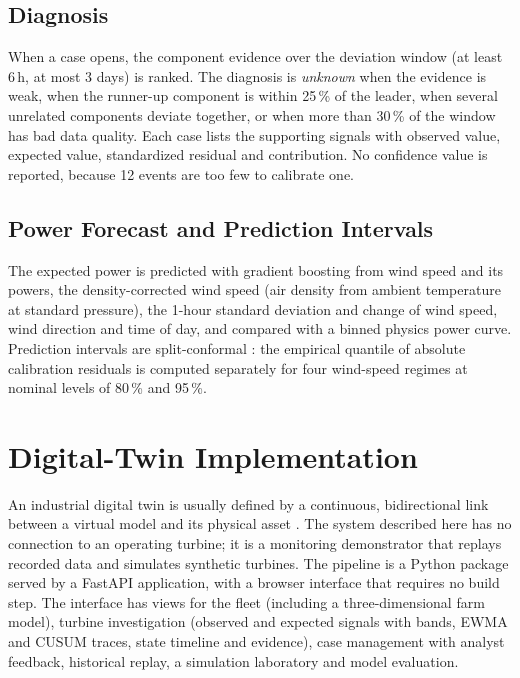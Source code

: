 \documentclass[conference]{IEEEtran}
\begin{document}
\subsection{Diagnosis}
When a case opens, the component evidence over the deviation window (at least 6\,h, at most 3 days) is ranked. The diagnosis is \emph{unknown} when the evidence is weak, when the runner-up component is within 25\,\% of the leader, when several unrelated components deviate together, or when more than 30\,\% of the window has bad data quality. Each case lists the supporting signals with observed value, expected value, standardized residual and contribution. No confidence value is reported, because 12 events are too few to calibrate one.

\subsection{Power Forecast and Prediction Intervals}
The expected power is predicted with gradient boosting from wind speed and its powers, the density-corrected wind speed (air density from ambient temperature at standard pressure), the 1-hour standard deviation and change of wind speed, wind direction and time of day, and compared with a binned physics power curve. Prediction intervals are split-conformal \cite{lei2018conformal}: the empirical quantile of absolute calibration residuals is computed separately for four wind-speed regimes at nominal levels of 80\,\% and 95\,\%.

\section{Digital-Twin Implementation}
An industrial digital twin is usually defined by a continuous, bidirectional link between a virtual model and its physical asset \cite{tao2019dt}. The system described here has no connection to an operating turbine; it is a monitoring demonstrator that replays recorded data and simulates synthetic turbines. The pipeline is a Python package served by a FastAPI application, with a browser interface that requires no build step. The interface has views for the fleet (including a three-dimensional farm model), turbine investigation (observed and expected signals with bands, EWMA and CUSUM traces, state timeline and evidence), case management with analyst feedback, historical replay, a simulation laboratory and model evaluation.
\end{document}
